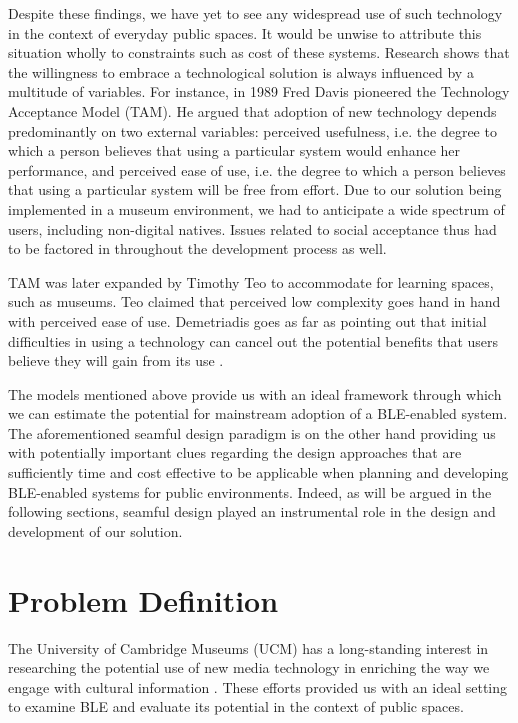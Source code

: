 \documentclass[prodmode,acmtomm]{acmsmall}
\begin{document}
Despite these findings, we have yet to see any widespread use of such technology in the context of everyday public spaces. It would be unwise to attribute this situation wholly to constraints such as cost of these systems. Research shows that the willingness to embrace a technological solution is always influenced by a multitude of variables. For instance, in 1989 Fred Davis pioneered the Technology Acceptance Model (TAM).\cite{davis1989} He argued that adoption of new technology depends predominantly on two external variables: perceived usefulness, i.e. the degree to which a person believes that using a particular system would enhance her performance, and perceived ease of use, i.e. the degree to which a person believes that using a particular system will be free from effort. Due to our solution being implemented in a museum environment, we had to anticipate a wide spectrum of users, including non-digital natives. Issues related to social acceptance thus had to be factored in throughout the development process as well. 

TAM was later expanded by Timothy Teo to accommodate for learning spaces, such as museums. \cite{teo2008}Teo claimed that perceived low complexity goes hand in hand with perceived ease of use. Demetriadis goes as far as pointing out that initial difficulties in using a technology can cancel out the potential benefits that users believe they will gain from its use \cite{Demetriadis2003}.

The models mentioned above provide us with an ideal framework through which we can estimate the potential for mainstream adoption of a BLE-enabled system. The aforementioned seamful design paradigm is on the other hand providing us with potentially important clues regarding the design approaches that are sufficiently time and cost effective to be applicable when planning and developing BLE-enabled systems for public environments. Indeed, as will be argued in the following sections, seamful design played an instrumental role in the design and development of our solution. 

\section{Problem Definition}
The University of Cambridge Museums (UCM) has a long-standing interest in researching the potential use of new media technology in enriching the way we engage with cultural information \cite{rosati2013}. These efforts provided us with an ideal setting to examine BLE and evaluate its potential in the context of public spaces. 
\end{document}
